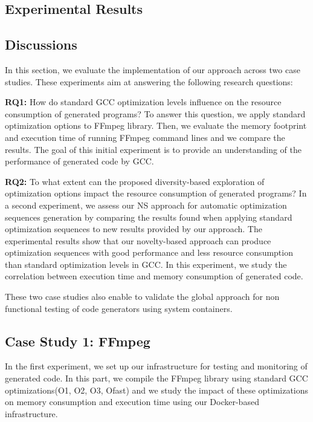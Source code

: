 \subsection{Experimental Results}
\subsection{Discussions}
\iffalse
In this section, we evaluate the implementation of our approach across two case studies. These experiments aim at answering the following research questions:

\textbf{RQ1:} How do standard GCC optimization levels influence on the resource consumption of generated programs?
To answer this question, we apply standard optimization options to FFmpeg library. Then, we evaluate the memory footprint and execution time of running FFmpeg command lines and we compare the results. The goal of this initial experiment is to
provide an understanding of the performance of generated code by GCC.

\textbf{RQ2:} To what extent can the proposed diversity-based exploration of optimization options impact the resource consumption of generated programs?
In a second experiment, we assess our NS approach for automatic optimization sequences generation by comparing the results found when applying standard optimization sequences to new results provided by our approach. The experimental results show that our novelty-based approach can produce optimization sequences with good performance and less resource consumption
than standard optimization levels in GCC. In this experiment, we study the correlation between execution time and memory consumption of generated code.

These two case studies  also enable to validate the global approach for non functional testing of code generators using system containers. 



\subsection{Case Study 1: FFmpeg}
In the first experiment, we set up our infrastructure for testing and monitoring of generated code. In this part, we compile the FFmpeg library using standard GCC optimizations(O1, O2, O3, Ofast) and we study the impact of these optimizations on memory consumption and execution time using our Docker-based infrastructure.

